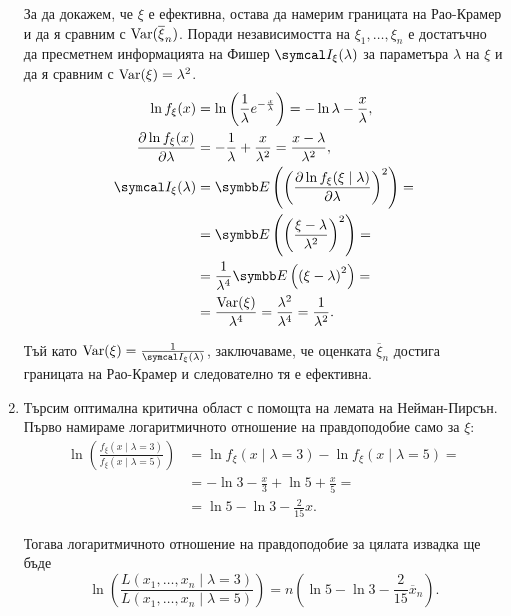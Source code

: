 \documentclass[
  headings=standardclasses,
  bibliography=totocnumbered,
]{scrartcl}
\begin{document}
\begin{solution}
\begin{enumerate}[label=\alph*)]
    За да докажем, че \( \xi \) е ефективна, остава да намерим границата на Рао-Крамер и да я сравним с \( \operatorname{Var}(\overline \xi_n) \). Поради независимостта на \( \xi_1, \ldots, \xi_n \) е достатъчно да пресметнем информацията на Фишер \( \FisherInfo_\xi(\lambda) \) за параметъра \( \lambda \) на \( \xi \) и да я сравним с \( \operatorname{Var}(\xi) = \lambda^2 \).
    \begin{align*}
      \ln f_\xi(x)
      &=
      \ln \left(\frac 1 \lambda e^{-\frac x \lambda} \right)
      =
      -\ln \lambda -\frac x \lambda,
      \\
      \frac {\partial \ln f_\xi(x)} {\partial \lambda}
      &=
      -\frac 1 \lambda + \frac x {\lambda^2}
      =
      \frac {x - \lambda} {\lambda^2},
      \\
      \FisherInfo_\xi(\lambda)
      &=
      \Expect \left( {\left( \frac {\partial \ln f_\xi(\xi \mid \lambda)} {\partial \lambda} \right)}^2 \right)
      = \\ &=
      \Expect \left( {\left( \frac {\xi - \lambda} {\lambda^2} \right)}^2 \right)
      = \\ &=
      \frac 1 {\lambda^4} \Expect \left( {({\xi - \lambda})}^2 \right)
      = \\ &=
      \frac {\Var(\xi)} {\lambda^4}
      =
      \frac {\lambda^2} {\lambda^4}
      =
      \frac 1 {\lambda^2}.
    \end{align*}

    Тъй като \( \Var(\xi) = \frac 1 {\FisherInfo_\xi(\lambda)} \), заключаваме, че оценката \( \overline \xi_n \) достига границата на Рао-Крамер и следователно тя е ефективна.

    \item Търсим оптимална критична област с помощта на лемата на Нейман-Пирсън. Първо намираме логаритмичното отношение на правдоподобие само за \( \xi \):
    \begin{align*}
      \ln \left(\frac {f_\xi(x \mid \lambda=3)} {f_\xi(x \mid \lambda=5)} \right)
      &=
      \ln f_\xi(x \mid \lambda=3) - \ln f_\xi(x \mid \lambda=5)
      = \\ &=
      - \ln 3 - \frac x 3 + \ln 5 + \frac x 5
      = \\ &=
      \ln 5 - \ln 3 - \frac 2 {15} x.
    \end{align*}

    Тогава логаритмичното отношение на правдоподобие за цялата извадка ще бъде
    \begin{equation*}
      \ln \left(\frac {L(x_1, \ldots, x_n \mid \lambda=3)} {L(x_1, \ldots, x_n \mid \lambda=5)} \right)
      =
      n \left(\ln 5 - \ln 3 - \frac 2 {15} \overline x_n \right).
    \end{equation*}


\end{enumerate}
\end{solution}
\end{document}
